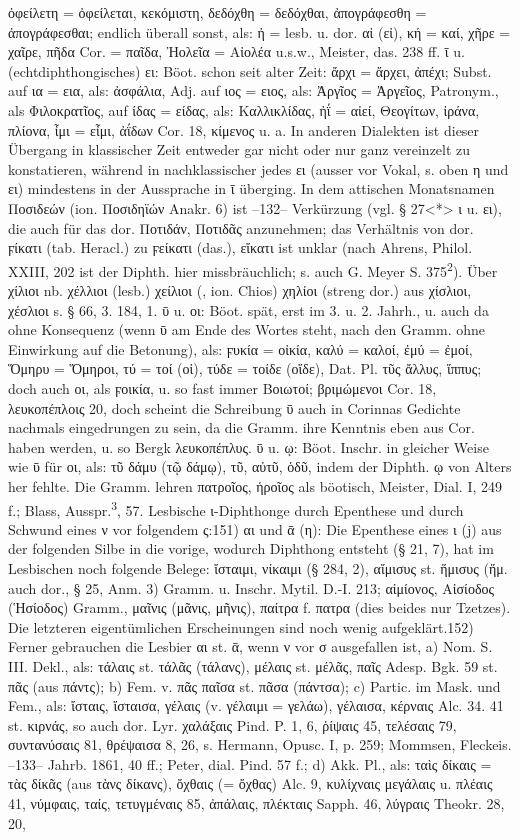 ὀφείλετη = ὀφείλεται, κεκόμιστη, δεδόχθη = δεδόχθαι, ἀπογράφεσθη = ἀπογράφεσθαι; endlich überall sonst, als: ἠ = lesb. u. dor. αἰ (εἰ), κή = καί, χῆρε = χαῖρε, πῆδα Cor. = παῖδα, Ἠολεῖα = Αἰολέα u.s.w., Meister, das. 238 ff. ῑ u. (echtdiphthongisches) ει: Böot. schon seit alter Zeit: ἄρχι = ἄρχει, ἀπέχι; Subst. auf ια = εια, als: ἀσφάλια, Adj. auf ιος = ειος, als: Ἀργῖος = Ἀργεῖος, Patronym., als Φιλοκρατῖος, auf ίδας = είδας, als: Καλλικλίδας, ἠΐ = αἰεί, Θεογίτων, ἰράνα, πλίονα, ἶμι = εἶμι, ἀΐδων Cor. 18, κίμενος u. a. In anderen Dialekten ist dieser Übergang in klassischer Zeit entweder gar nicht oder nur ganz vereinzelt zu konstatieren, während in nachklassischer jedes ει (ausser vor Vokal, s. oben η und ει) mindestens in der Aussprache in ῑ überging. In dem attischen Monatsnamen Ποσιδεών (ion. Ποσιδηϊών Anakr. 6) ist --132-- Verkürzung (vgl. § 27<*> ι u. ει), die auch für das dor. Ποτιδάν, Ποτιδᾶς anzunehmen; das Verhältnis von dor. ϝίκατι (tab. Heracl.) zu ϝείκατι (das.), εἴκατι ist unklar (nach Ahrens, Philol. XXIII, 202 ist der Diphth. hier missbräuchlich; s. auch G. Meyer S. 375\textsuperscript{2}). Über χίλιοι nb. χέλλιοι (lesb.) χείλιοι (, ion. Chios) χηλίοι (streng dor.) aus χίσλιοι, χέσλιοι s. § 66, 3. 184, 1. ῡ u. οι: Böot. spät, erst im 3. u. 2. Jahrh., u. auch da ohne Konsequenz (wenn ῡ am Ende des Wortes steht, nach den Gramm. ohne Einwirkung auf die Betonung), als: ϝυκία = οἰκία, καλύ = καλοί, ἐμύ = ἐμοί, Ὅμηρυ = Ὅμηροι, τύ = τοί (οἱ), τύδε = τοίδε (οἵδε), Dat. Pl. τῦς ἄλλυς, ἵππυς; doch auch οι, als ϝοικία, u. so fast immer Βοιωτοί; βριμώμενοι Cor. 18, λευκοπέπλοις 20, doch scheint die Schreibung ῡ auch in Corinnas Gedichte nachmals eingedrungen zu sein, da die Gramm. ihre Kenntnis eben aus Cor. haben werden, u. so Bergk λευκοπέπλυς. ῡ u. ῳ: Böot. Inschr. in gleicher Weise wie ῡ für οι, als: τῦ δάμυ (τῷ δάμῳ), τῦ, αὐτῦ, ὁδῦ, indem der Diphth. ῳ von Alters her fehlte. Die Gramm. lehren πατροῖος, ἡροῖος als böotisch, Meister, Dial. I, 249 f.; Blass, Ausspr.\textsuperscript{3}, 57. Lesbische ι-Diphthonge durch Epenthese und durch Schwund eines ν vor folgendem ς:151) αι und ᾱ (η): Die Epenthese eines ι (j) aus der folgenden Silbe in die vorige, wodurch Diphthong entsteht (§ 21, 7), hat im Lesbischen noch folgende Belege: ἴσταιμι, νίκαιμι (§ 284, 2), αἴμισυς st. ἥμισυς (ἥμ. auch dor., § 25, Anm. 3) Gramm. u. Inschr. Mytil. D.-I. 213; αἰμίονος, Αἰσίοδος (Ἡσίοδος) Gramm., μαῖνις (μᾶνις, μῆνις), παίτρα f. πατρα (dies beides nur Tzetzes). Die letzteren eigentümlichen Erscheinungen sind noch wenig aufgeklärt.152) Ferner gebrauchen die Lesbier αι st. ᾱ, wenn ν vor σ ausgefallen ist, a) Nom. S. III. Dekl., als: τάλαις st. τάλᾶς (τάλανς), μέλαις st. μέλᾶς, παῖς Adesp. Bgk. 59 st. πᾶς (aus πάντς); b) Fem. v. πᾶς παῖσα st. πᾶσα (πάντσα); c) Partic. im Mask. und Fem., als: ἴσταις, ἴσταισα, γέλαις (v. γέλαιμι = γελάω), γέλαισα, κέρναις Alc. 34. 41 st. κιρνάς, so auch dor. Lyr. χαλάξαις Pind. P. 1, 6, ῥίψαις 45, τελέσαις 79, συντανύσαις 81, θρέψαισα 8, 26, s. Hermann, Opusc. I, p. 259; Mommsen, Fleckeis. --133-- Jahrb. 1861, 40 ff.; Peter, dial. Pind. 57 f.; d) Akk. Pl., als: ταὶς δίκαις = τὰς δίκᾶς (aus τὰνς δίκανς), ὄχθαις (= ὄχθας) Alc. 9, κυλίχναις μεγάλαις u. πλέαις 41, νύμφαις, ταίς, τετυγμέναις 85, ἀπάλαις, πλέκταις Sapph. 46, λύγραις Theokr. 28, 20, 